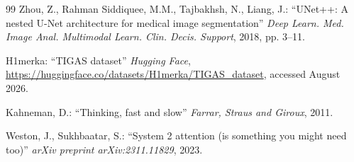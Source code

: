 \documentclass[11pt,a4paper]{article}
\begin{document}
\begin{thebibliography}{99}
Zhou, Z., Rahman Siddiquee, M.M., Tajbakhsh, N., Liang, J.: ``UNet++: A nested U-Net architecture for medical image segmentation'' \emph{Deep Learn. Med. Image Anal. Multimodal Learn. Clin. Decis. Support}, 2018, pp. 3--11.

H1merka: ``TIGAS dataset'' \emph{Hugging Face}, \url{https://huggingface.co/datasets/H1merka/TIGAS_dataset}, accessed August 2026.

Kahneman, D.: ``Thinking, fast and slow'' \emph{Farrar, Straus and Giroux}, 2011.

Weston, J., Sukhbaatar, S.: ``System 2 attention (is something you might need too)'' \emph{arXiv preprint arXiv:2311.11829}, 2023.

\end{thebibliography}
\end{document}
